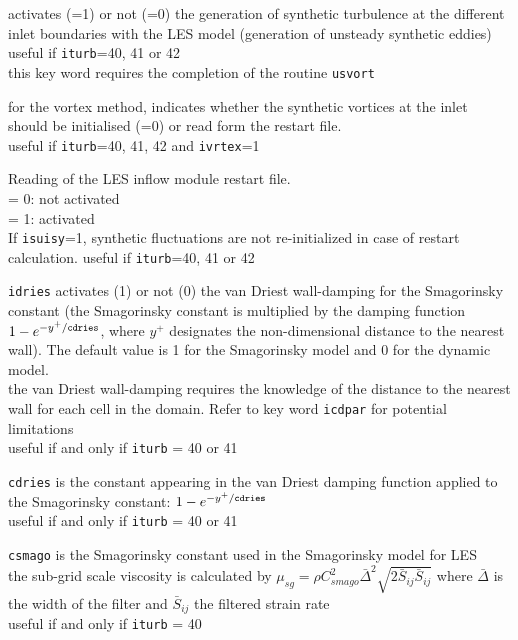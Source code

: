 
{activates (=1) or not (=0) the generation of synthetic turbulence at the
different inlet boundaries with the LES model (generation of unsteady synthetic
eddies)\\
useful if {\tt iturb}=40, 41 or 42\\
this key word requires the completion of the routine
\texttt{usvort}}

{for the vortex method, indicates whether the synthetic vortices at the inlet
should be initialised (=0) or read form the restart file.\\
useful if {\tt iturb}=40, 41, 42 and {\tt ivrtex}=1}

{Reading of the LES inflow module restart file.\\
\hspace*{1.3cm}= 0: not activated \\
\hspace*{1.3cm}= 1: activated\\
If {\tt isuisy}=1, synthetic fluctuations are not re-initialized in case of restart calculation.
useful if {\tt iturb}=40, 41 or 42
}

{{\tt idries} activates (1) or not (0) the van
Driest wall-damping for the Smagorinsky constant (the Smagorinsky
constant is multiplied by the damping function
$1-e^{-y^+/{\tt cdries}}$, where $y^+$ designates the non-dimensional
distance to the nearest wall). The default value is 1 for the
Smagorinsky model and 0 for the dynamic model.\\
the van Driest wall-damping requires the knowledge of the distance to the
nearest wall for each cell in the domain. Refer to key word {\tt icdpar}
for potential limitations\\
useful if and only if {\tt iturb} = 40 or 41}

{{\tt cdries} is the constant appearing in the
van Driest damping function applied to the Smagorinsky constant:
 $1-e^{-y^+/{\tt cdries}}$\\
useful if and only if {\tt iturb} = 40 or 41}

{{\tt csmago} is the Smagorinsky constant used in
the Smagorinsky model for LES\\
the sub-grid scale viscosity is calculated by
 $\displaystyle\mu_{sg}=\rho C_{smago}^2\bar{\Delta}^2\sqrt{2\bar{S}_{ij}\bar{S}_{ij}}$
where $\bar{\Delta}$ is the width of the filter and $\bar{S}_{ij}$ the filtered
strain rate\\
useful if and only if {\tt iturb} = 40}

